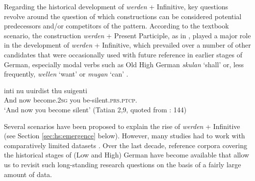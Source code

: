 \documentclass[output=paper,colorlinks,citecolor=brown]{langscibook}
\begin{document}
Regarding the historical development of \textit{werden} + Infinitive, key questions revolve around the question of which constructions can be considered potential predecessors and/or competitors of the pattern. According to the textbook scenario, the construction \textit{werden} + Present Participle, as in , played a major role in the development of \textit{werden} + Infinitive, which prevailed over a number of other candidates that were occasionally used with future reference in earlier stages of German, especially modal verbs such as Old High German \textit{skulan} `shall' or, less frequently, \textit{wellen} `want' or \textit{mugan} `can' \citep[see][144--148]{szczepaniakGrammatikalisierungImDeutschen2011}. 

\ea \label{ex:hs:tatian}
\gll inti nu uuirdist thu suigenti \\
And now become.\textsc{2sg} you be-silent.\textsc{prs.ptcp.} \\
\glt `And now you become silent' (Tatian 2,9, quoted from \citeauthor{szczepaniakGrammatikalisierungImDeutschen2011} \citeyear{szczepaniakGrammatikalisierungImDeutschen2011}: 144)
\z

Several scenarios have been proposed to explain the rise of \textit{werden} + Infinitive (see Section \ref{sec:hs:emergence} below). However, many studies had to work with comparatively limited datasets \citep[e.g.][]{Schmid2000}. Over the last decade, reference corpora covering the historical stages of (Low and High) German have become available that allow us to revisit such long-standing research questions on the basis of a fairly large amount of data. 
\end{document}
